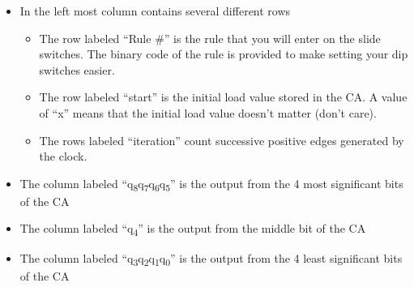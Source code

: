 \begin{itemize}
\item
  In the left most column contains several different rows

  \begin{itemize}
  \item
    The row labeled ``Rule \#'' is the rule that you will enter on the
    slide switches. The binary code of the rule is provided to make
    setting your dip switches easier.
  \item
    The row labeled ``start'' is the initial load value stored in the
    CA. A value of ``x'' means that the initial load value doesn't
    matter (don't care).
  \item
    The rows labeled ``iteration'' count successive positive edges
    generated by the clock.
  \end{itemize}
\item
  The column labeled
  ``q\textsubscript{8}q\textsubscript{7}q\textsubscript{6}q\textsubscript{5}''
  is the output from the 4 most significant bits of the CA
\item
  The column labeled ``q\textsubscript{4}'' is the output from the
  middle bit of the CA
\item
  The column labeled
  ``q\textsubscript{3}q\textsubscript{2}q\textsubscript{1}q\textsubscript{0}''
  is the output from the 4 least significant bits of the CA
\end{itemize}


